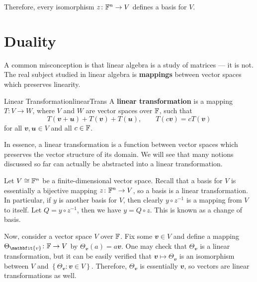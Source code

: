 \documentclass[math]{amznotes}
\theoremstyle{remark}
\begin{document}
Therefore, every isomorphism $z \colon \mathbb{F}^n \to V$ defines a basis for $V$.
\section{Duality}
A common misconception is that linear algebra is a study of matrices --- it is not. The real subject studied in linear algebra is \textbf{mappings} between vector spaces which preserves linearity.
\begin{dfnbox}{Linear Transformation}{linearTrans}
    A {\color{red} \textbf{linear transformation}} is a mapping $T \colon V \to W$, where $V$ and $W$ are vector spaces over $\mathbb{F}$, such that
    \begin{equation*}
        T(\mathbfit{v + u}) + T(\mathbfit{v}) + T(\mathbfit{u}), \qquad T(c\mathbfit{v}) = cT(\mathbfit{v})
    \end{equation*}
    for all $\mathbfit{v}, \mathbfit{u} \in V$ and all $c \in \mathbb{F}$.
\end{dfnbox}
In essence, a linear transformation is a function between vector spaces which preserves the vector structure of its domain. We will see that many notions discussed so far can actually be abstracted into a linear transformation.

Let $V \cong \mathbb{F}^n$ be a finite-dimensional vector space. Recall that a basis for $V$ is essentially a bijective mapping $z \colon \mathbb{F}^n \to V$, so a basis is a linear transformation. In particular, if $y$ is another basis for $V$, then clearly $y \circ z^{-1}$ is a mapping from $V$ to itself. Let $Q = y \circ z^{-1}$, then we have $y = Q \circ z$. This is known as a change of basis.

Now, consider a vector space $V$ over $\mathbb{F}$. Fix some $\mathbfit{v} \in V$ and define a mapping $\Theta_{\mathbfit{v}} \colon \F \to V$ by $\Theta_{\mathbfit{v}}(a) = a\mathbfit{v}$. One may check that $\Theta_{\mathbfit{v}}$ is a linear transformation, but it can be easily verified that $\mathbfit{v} \mapsto \Theta_{\mathbfit{v}}$ is an isomorphism between $V$ and $\left\{\Theta_{\mathbfit{v}} \colon \mathbfit{v} \in V\right\}$. Therefore, $\Theta_{\mathbfit{v}}$ is essentially $\mathbfit{v}$, so vectors are linear transformations as well.
\end{document}
